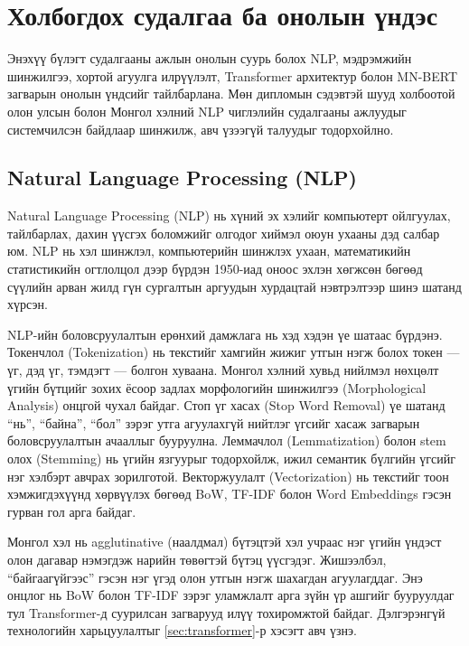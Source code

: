 ﻿%
%
\chapter{Холбогдох судалгаа ба онолын үндэс}
\label{Chapter2}

Энэхүү бүлэгт судалгааны ажлын онолын суурь болох NLP, мэдрэмжийн шинжилгээ,
хортой агуулга илрүүлэлт, Transformer архитектур болон MN-BERT загварын онолын
үндсийг тайлбарлана. Мөн дипломын сэдэвтэй шууд холбоотой олон улсын болон
Монгол хэлний NLP чиглэлийн судалгааны ажлуудыг системчилсэн байдлаар шинжилж,
авч үзээгүй талуудыг тодорхойлно.


\section{Natural Language Processing (NLP)}

Natural Language Processing (NLP) нь хүний эх хэлийг компьютерт ойлгуулах,
тайлбарлах, дахин үүсгэх боломжийг олгодог хиймэл оюун ухааны дэд салбар юм.
NLP нь хэл шинжлэл, компьютерийн шинжлэх ухаан, математикийн статистикийн
огтлолцол дээр бүрдэн 1950-иад оноос эхлэн хөгжсөн бөгөөд сүүлийн арван жилд
гүн сургалтын аргуудын хурдацтай нэвтрэлтээр шинэ шатанд хүрсэн.

NLP-ийн боловсруулалтын ерөнхий дамжлага нь хэд хэдэн үе шатаас бүрдэнэ.
Токенчлол (Tokenization) нь текстийг хамгийн жижиг утгын нэгж болох токен ---
үг, дэд үг, тэмдэгт --- болгон хуваана. Монгол хэлний хувьд нийлмэл нөхцөлт
үгийн бүтцийг зохих ёсоор задлах морфологийн шинжилгээ (Morphological
Analysis) онцгой чухал байдаг. Стоп үг хасах (Stop Word Removal) үе шатанд
``нь'', ``байна'', ``бол'' зэрэг утга агуулахгүй нийтлэг үгсийг хасаж загварын
боловсруулалтын ачааллыг бууруулна. Леммачлол (Lemmatization) болон stem олох
(Stemming) нь үгийн язгуурыг тодорхойлж, ижил семантик бүлгийн үгсийг нэг
хэлбэрт авчрах зорилготой. Векторжуулалт (Vectorization) нь текстийг тоон
хэмжигдэхүүнд хөрвүүлэх бөгөөд BoW, TF-IDF болон Word Embeddings гэсэн гурван
гол арга байдаг.

Монгол хэл нь agglutinative (наалдмал) бүтэцтэй хэл учраас нэг үгийн үндэст
олон дагавар нэмэгдэж нарийн төвөгтэй бүтэц үүсгэдэг. Жишээлбэл,
``байгаагүйгээс'' гэсэн нэг үгэд олон утгын нэгж шахагдан агуулагддаг. Энэ
онцлог нь BoW болон TF-IDF зэрэг уламжлалт арга зүйн үр ашгийг бууруулдаг тул
Transformer-д суурилсан загварууд илүү тохиромжтой байдаг. Дэлгэрэнгүй
технологийн харьцуулалтыг \ref{sec:transformer}-р хэсэгт авч үзнэ.

